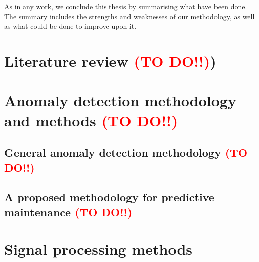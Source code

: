 \documentclass[11pt, oneside]{article}   	%
\begin{document}
As in any work, we conclude this thesis by summarising what have been done. The summary includes the strengths and weaknesses of our methodology, as well as what could be done to improve upon it.



\section{Literature review  \textcolor{red}{(TO DO!!)})}


\section{Anomaly detection methodology and methods \textcolor{red}{(TO DO!!)}}
\subsection{General anomaly detection methodology   \textcolor{red}{(TO DO!!)}}
\subsection{A proposed methodology for predictive maintenance   \textcolor{red}{(TO DO!!)}}







\section{Signal processing methods}
\end{document}
